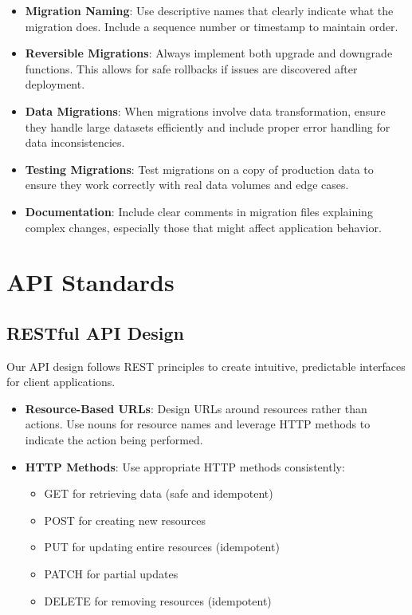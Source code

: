 \documentclass[12pt]{article}
\begin{document}
\begin{itemize}
    \item \textbf{Migration Naming}: Use descriptive names that clearly indicate what the migration does. Include a sequence number or timestamp to maintain order.
    
    \item \textbf{Reversible Migrations}: Always implement both upgrade and downgrade functions. This allows for safe rollbacks if issues are discovered after deployment.
    
    \item \textbf{Data Migrations}: When migrations involve data transformation, ensure they handle large datasets efficiently and include proper error handling for data inconsistencies.
    
    \item \textbf{Testing Migrations}: Test migrations on a copy of production data to ensure they work correctly with real data volumes and edge cases.
    
    \item \textbf{Documentation}: Include clear comments in migration files explaining complex changes, especially those that might affect application behavior.
\end{itemize}

\section{API Standards}

\subsection{RESTful API Design}
Our API design follows REST principles to create intuitive, predictable interfaces for client applications.

\begin{itemize}
    \item \textbf{Resource-Based URLs}: Design URLs around resources rather than actions. Use nouns for resource names and leverage HTTP methods to indicate the action being performed.
    
    \item \textbf{HTTP Methods}: Use appropriate HTTP methods consistently:
    \begin{itemize}
        \item GET for retrieving data (safe and idempotent)
        \item POST for creating new resources
        \item PUT for updating entire resources (idempotent)
        \item PATCH for partial updates
        \item DELETE for removing resources (idempotent)
    \end{itemize}
\end{itemize}
\end{document}

